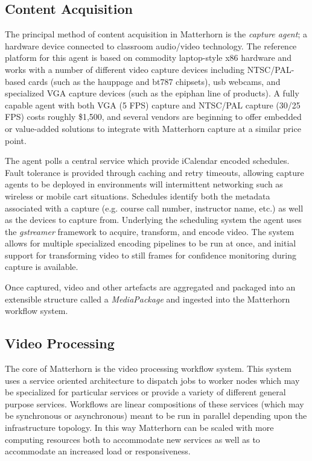 \documentclass{sig-alternate}
\begin{document}
\subsection{Content Acquisition}
The principal method of content acquisition in Matterhorn is the \emph{capture agent}; a hardware device connected to classroom audio/video technology.  The reference platform for this agent is based on commodity laptop-style x86 hardware and works with a number of different video capture devices including NTSC/PAL-based cards (such as the hauppage and bt787 chipsets), usb webcams, and specialized VGA capture devices (such as the epiphan line of products).  A fully capable agent with both VGA (5 FPS) capture and NTSC/PAL capture (30/25 FPS) costs roughly \$1,500, and several vendors are beginning to offer embedded or value-added solutions to integrate with Matterhorn capture at a similar price point.

The agent polls a central service which provide iCalendar encoded schedules.  Fault tolerance is provided through caching and retry timeouts, allowing capture agents to be deployed in environments will intermittent networking such as wireless or mobile cart situations.  Schedules identify both the metadata associated with a capture (e.g. course call number, instructor name, etc.) as well as the devices to capture from.  Underlying the scheduling system the agent uses the \emph{gstreamer} framework to acquire, transform, and encode video.  The system allows for multiple specialized encoding pipelines to be run at once, and initial support for transforming video to still frames for confidence monitoring during capture is available.

Once captured, video and other artefacts are aggregated and packaged into an extensible structure called a \emph{MediaPackage} and ingested into the Matterhorn workflow system.

\subsection{Video Processing}
The core of Matterhorn is the video processing workflow system.  This system uses a service oriented architecture to dispatch jobs to worker nodes which may be specialized for particular services or provide a variety of different general purpose services.  Workflows are linear compositions of these services (which may be synchronous or asynchronous) meant to be run in parallel depending upon the infrastructure topology.  In this way Matterhorn can be scaled with more computing resources both to accommodate new services as well as to accommodate an increased load or responsiveness.
\end{document}
